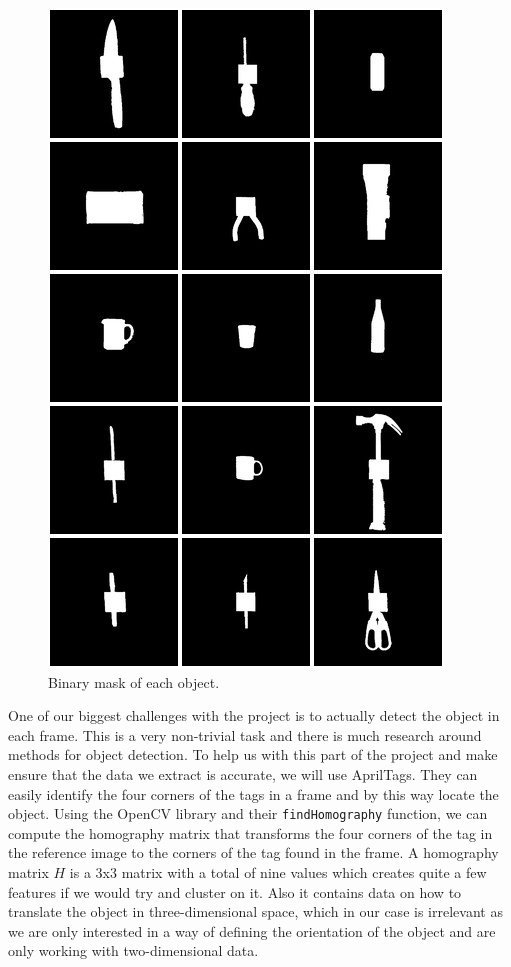 \begin{figure}
	\centering
	\includegraphics[width=\textwidth]{img/methods/masks.jpg}
	\caption{Binary mask of each object.}
	\label{fig:masks_montage}
\end{figure}

One of our biggest challenges with the project is to actually detect the object in each frame. This is a very non-trivial task and there is much research around methods for object detection. To help us with this part of the project and make ensure that the data we extract is accurate, we will use AprilTags. They can easily identify the four corners of the tags in a frame and by this way locate the object. Using the OpenCV library and their \texttt{findHomography} function, we can compute the homography matrix that transforms the four corners of the tag in the reference image to the corners of the tag found in the frame. A homography matrix \(H\) is a 3x3 matrix with a total of nine values which creates quite a few features if we would try and cluster on it. Also it contains data on how to translate the object in three-dimensional space, which in our case is irrelevant as we are only interested in a way of defining the orientation of the object and are only working with two-dimensional data.


